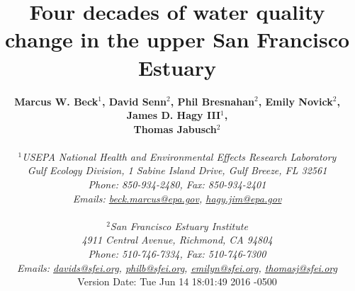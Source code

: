 \documentclass[letterpaper,12pt,oneside]{article}\usepackage[]{graphicx}\usepackage[]{color}
\begin{document}
\raggedbottom
\linenumbers
\raggedright
{}
\setlength{\parindent}{0.5in}
\renewcommand\refname{References \vspace{12pt}}

\begin{singlespace}
\title{{\bf {\Large Four decades of water quality change in the upper San Francisco Estuary}}}
\author{
  {\bf {\normalsize Marcus W. Beck$^1$, David Senn$^2$, Phil Bresnahan$^2$, Emily Novick$^2$, James D. Hagy III$^1$,}}
  \\{\bf {\normalsize Thomas Jabusch$^2$}}
  \\\\{\textit {\normalsize $^1$USEPA National Health and Environmental Effects Research Laboratory}}
  \\{\textit {\normalsize Gulf Ecology Division, 1 Sabine Island Drive, Gulf Breeze, FL 32561}}
	\\{\textit {\normalsize Phone: 850-934-2480, Fax: 850-934-2401}}
	\\{\textit {\normalsize Emails: \href{mailto:beck.marcus@epa.gov}{beck.marcus@epa.gov}, \href{mailto:hagy.jim@epa.gov}{hagy.jim@epa.gov}}}
  \\\\{\textit {\normalsize $^2$San Francisco Estuary Institute}}
	\\{\textit {\normalsize 4911 Central Avenue, Richmond, CA 94804}}
	\\{\textit {\normalsize Phone: 510-746-7334, Fax: 510-746-7300}}
	\\{\textit {\normalsize Emails: \href{mailto:davids@sfei.org}{davids@sfei.org}, \href{mailto:philb@sfei.org}{philb@sfei.org}, \href{mailto:emilyn@sfei.org}{emilyn@sfei.org}, \href{mailto:thomasj@sfei.org}{thomasj@sfei.org}}}
  \vspace{1in} 
  \\ Version Date:   Tue Jun 14 18:01:49 2016 -0500
	}
\date{}
\maketitle
\end{singlespace}
\clearpage
\end{document}
